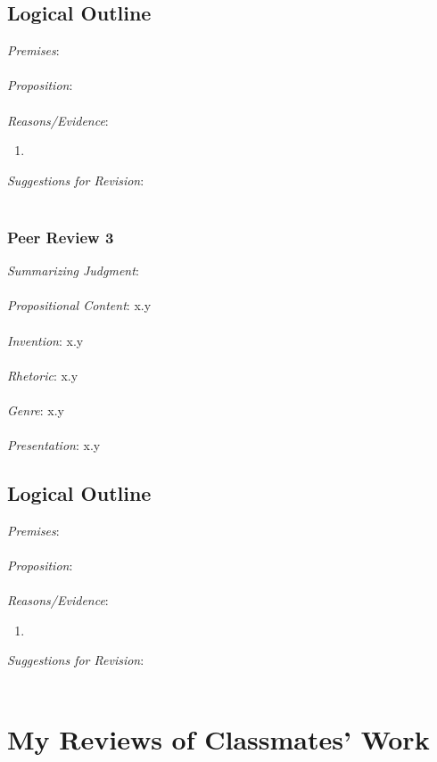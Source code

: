 \documentclass[12pt]{article}
\begin{document}
\subsection*{Logical Outline}
\noindent \textit{Premises}: \\ \\
\textit{Proposition}: \\ \\
\textit{Reasons/Evidence}:
\begin{enumerate}
	\item \ %
\end{enumerate}
\textit{Suggestions for Revision}: \\\\

\subsubsection*{Peer Review 3}
\noindent \textit{Summarizing Judgment}: \\ \\
\textit{Propositional Content}: x.y \\ \\ %
\textit{Invention}: x.y \\ \\
\textit{Rhetoric}: x.y \\ \\
\textit{Genre}: x.y \\ \\
\textit{Presentation}: x.y
\subsection*{Logical Outline}
\noindent \textit{Premises}: \\ \\
\textit{Proposition}: \\ \\
\textit{Reasons/Evidence}:
\begin{enumerate}
	\item \ %
\end{enumerate}
\textit{Suggestions for Revision}: \\\\




\newpage
\section{My Reviews of Classmates' Work} 
\end{document}
